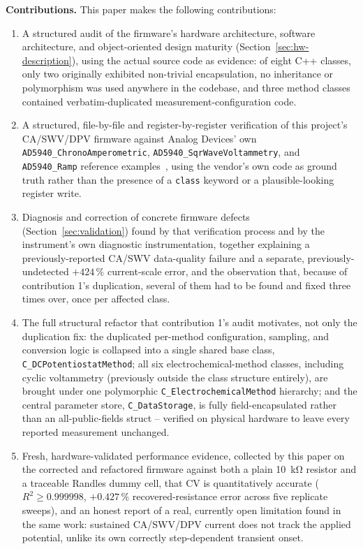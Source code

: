 \textbf{Contributions.} This paper makes the following contributions:
\begin{enumerate}
\item A structured audit of the firmware's hardware architecture, software
  architecture, and object-oriented design maturity
  (Section~\ref{sec:hw-description}), using the actual source code as
  evidence: of eight C++ classes, only two originally exhibited non-trivial
  encapsulation, no inheritance or polymorphism was used anywhere in the
  codebase, and three method classes contained verbatim-duplicated
  measurement-configuration code.
\item A structured, file-by-file and register-by-register verification of
  this project's CA/SWV/DPV firmware against Analog Devices' own
  \texttt{AD5940\_ChronoAmperometric}, \texttt{AD5940\_SqrWaveVoltammetry},
  and \texttt{AD5940\_Ramp} reference examples~\cite{ad5940_examples_github},
  using the vendor's own code as ground truth rather than the presence of a
  \texttt{class} keyword or a plausible-looking register write.
\item Diagnosis and correction of concrete firmware defects
  (Section~\ref{sec:validation}) found by that verification process and by the
  instrument's own diagnostic instrumentation, together explaining a
  previously-reported CA/SWV data-quality failure and a separate,
  previously-undetected $+424\,\%$ current-scale error, and the observation
  that, because of contribution 1's duplication, several of them had to be
  found and fixed three times over, once per affected class.
\item The full structural refactor that contribution 1's audit motivates,
  not only the duplication fix: the duplicated per-method configuration,
  sampling, and conversion logic is collapsed into a single shared base
  class, \texttt{C\_DCPotentiostatMethod}; all six electrochemical-method
  classes, including cyclic voltammetry (previously outside the class
  structure entirely), are brought under one polymorphic
  \texttt{C\_ElectrochemicalMethod} hierarchy; and the central parameter
  store, \texttt{C\_DataStorage}, is fully field-encapsulated rather than
  an all-public-fields struct -- verified on physical hardware to leave
  every reported measurement unchanged.
\item Fresh, hardware-validated performance evidence, collected by this
  paper on the corrected and refactored firmware against both a plain
  \SI{10}{\kilo\ohm} resistor and a traceable Randles dummy cell, that CV
  is quantitatively accurate ($R^2\geq0.999998$,
  $+0.427\,\%$ recovered-resistance error across five replicate sweeps),
  and an honest report of a real, currently open limitation found in the
  same work: sustained CA/SWV/DPV current does not track the applied
  potential, unlike its own correctly step-dependent transient onset.
\end{enumerate}

